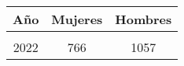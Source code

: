 \begin{tabular}[t]{ccc}
\toprule
\textbf{Año} & \textbf{Mujeres} & \textbf{Hombres}\\
\midrule
\cellcolor[HTML]{B6B3FF}{2018} & \cellcolor[HTML]{B6B3FF}{1000} & \cellcolor[HTML]{B6B3FF}{1288}\\
2022 & 766 & 1057\\
\bottomrule
\end{tabular}
